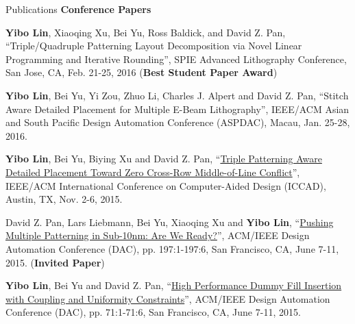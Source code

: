 \begin{rSection}{Publications}
\textbf{Conference Papers}
\begin{description}[font=\normalfont]
\item[{[C5]}]{
    \textbf{Yibo Lin}, Xiaoqing Xu, Bei Yu, Ross Baldick, and David Z. Pan, 
    ``Triple/Quadruple Patterning Layout Decomposition via Novel Linear Programming and Iterative Rounding'', 
    SPIE Advanced Lithography Conference, San Jose, CA, Feb. 21-25, 2016
    (\textbf{Best Student Paper Award})
}
\item[{[C4]}]{
 \textbf{Yibo Lin}, Bei Yu, Yi Zou, Zhuo Li, Charles J. Alpert and David Z. Pan, 
    ``Stitch Aware Detailed Placement for Multiple E-Beam Lithography'', 
    IEEE/ACM Asian and South Pacific Design Automation Conference (ASPDAC), Macau, Jan. 25-28, 2016.
}
\item[{[C3]}]{
 \textbf{Yibo Lin}, Bei Yu, Biying Xu and David Z. Pan, 
 ``\href{http://dl.acm.org/citation.cfm?id=2840875}{Triple Patterning Aware Detailed Placement Toward Zero Cross-Row Middle-of-Line Conflict}'', 
    IEEE/ACM International Conference on Computer-Aided Design (ICCAD), Austin, TX, Nov. 2-6, 2015.
}
\item[{[C2]}]{
 David Z. Pan, Lars Liebmann, Bei Yu, Xiaoqing Xu and \textbf{Yibo Lin}, 
 ``\href{http://dl.acm.org/citation.cfm?id=2744769.2747940}{Pushing Multiple Patterning in Sub-10nm: Are We Ready?}'', 
    ACM/IEEE Design Automation Conference (DAC), pp. 197:1-197:6, San Francisco, CA, June 7-11, 2015. 
    (\textbf{Invited Paper})
}
\item[{[C1]}]{
 \textbf{Yibo Lin}, Bei Yu and David Z. Pan, 
 ``\href{http://dl.acm.org/citation.cfm?id=2744769.2744850}{High Performance Dummy Fill Insertion with Coupling and Uniformity Constraints}'',
    ACM/IEEE Design Automation Conference (DAC), pp. 71:1-71:6, San Francisco, CA, June 7-11, 2015. 
}
\end{description}


\end{rSection}

